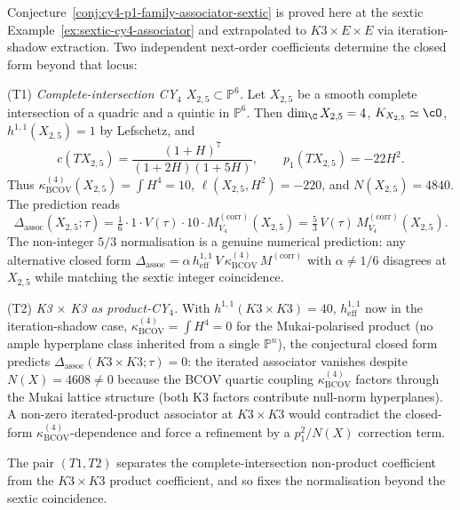 \begin{remark}
\label{rem:cy4-associator-next-coefficients}
Conjecture~\ref{conj:cy4-p1-family-associator-sextic} is proved here
at the sextic Example~\ref{ex:sextic-cy4-associator} and extrapolated
to $K3 \times E \times E$ via iteration-shadow extraction. Two
independent next-order coefficients determine the closed form beyond
that locus:

\noindent\textup{(T1)} \emph{Complete-intersection CY${}_4$ \(X_{2,5}\subset\mathbb P^6\).}
Let \(X_{2,5}\) be a smooth complete intersection of a quadric and a quintic in \(\mathbb P^6\). Then \(\dim_\C X_{2,5}=4\), \(K_{X_{2,5}}\simeq\cO\), \(h^{1,1}(X_{2,5})=1\) by Lefschetz, and
\[
 c(TX_{2,5})=\frac{(1+H)^7}{(1+2H)(1+5H)},\qquad
 p_1(TX_{2,5})=-22H^2.
\]
Thus \(\kappa_{\mathrm{BCOV}}^{(4)}(X_{2,5})=\int H^4=10\),
\(\ell(X_{2,5},H^2)=-220\), and \(N(X_{2,5})=4840\). The prediction reads
\[
\Delta_{\mathrm{assoc}}(X_{2,5};\tau)
= \tfrac{1}{6}\cdot 1\cdot V(\tau)\cdot 10\cdot
M^{(\mathrm{corr})}_{V_4}(X_{2,5})
= \tfrac{5}{3}\,V(\tau)\,M^{(\mathrm{corr})}_{V_4}(X_{2,5}).
\]
The non-integer $5/3$ normalisation is a genuine numerical prediction: any
alternative closed form $\Delta_{\mathrm{assoc}} = \alpha \, h^{1,1}_{\mathrm{eff}}
\, V \, \kappa_{\mathrm{BCOV}}^{(4)} \, M^{(\mathrm{corr})}$ with $\alpha \neq 1/6$ disagrees
at \(X_{2,5}\) while matching the sextic integer coincidence.

\noindent\textup{(T2)} \emph{K3 $\times$ K3 as product-CY${}_4$.}
With $h^{1,1}(K3 \times K3) = 40$, $h^{1,1}_{\mathrm{eff}}$ now in the
iteration-shadow case, $\kappa_{\mathrm{BCOV}}^{(4)} = \int H^4 = 0$ for the Mukai-polarised
product (no ample hyperplane class inherited from a single $\mathbb{P}^n$),
the conjectural closed form predicts $\Delta_{\mathrm{assoc}}(K3 \times K3;\tau)
= 0$: the iterated associator vanishes despite $N(X) = 4608 \neq 0$ because
the BCOV quartic coupling $\kappa_{\mathrm{BCOV}}^{(4)}$ factors through the Mukai lattice
structure (both K3 factors contribute null-norm hyperplanes). A non-zero
iterated-product associator at $K3 \times K3$ would contradict the closed-form
$\kappa_{\mathrm{BCOV}}^{(4)}$-dependence and force a refinement by a $p_1^2 / N(X)$ correction
term.

The pair $(T1, T2)$ separates the complete-intersection non-product coefficient from
the \(K3\times K3\) product coefficient, and so fixes the normalisation
beyond the sextic coincidence.
\end{remark}

